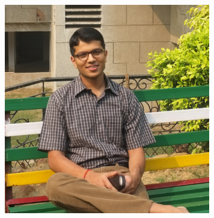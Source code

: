 \documentclass[margin, 10pt]{res} %
\begin{document}
\begin{resume}
\begin{figure}[ht!]
\centering
\includegraphics[width=90mm]{pp.jpg}
\label{overflow}
\end{figure}



\end{resume}
\end{document}

